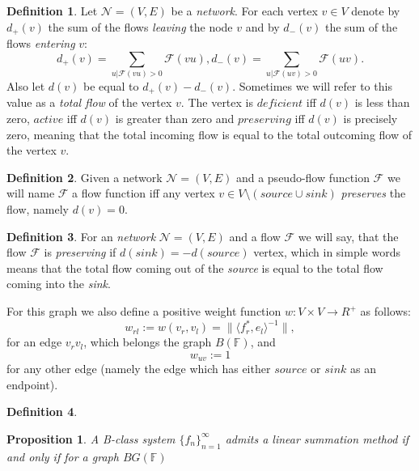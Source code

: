 \documentclass[12pt]{article}
\renewcommand{\cal}[1]{\mathcal{#1}}
\newtheorem{prop}{Proposition}
\theoremstyle{definition}
\newtheorem{definition}{Definition}
\newcommand{\seq}[1]{\{{#1}_n\}_{n=1}^\infty}
\newcommand{\fsys}{\mathbb{F}}
\numberwithin{remark}{section}
\numberwithin{theorem}{section}
\numberwithin{prop}{section}
\numberwithin{equation}{section}
\numberwithin{lemma}{section}
\numberwithin{prop_under_lemma}{lemma}
\begin{document}
    \begin{definition}
        Let $\cal{N} = (V, E)$ be a \textit{network}. For each vertex $v \in V$
        denote by $d_{+}(v)$ the sum of the flows \textit{leaving} the node $v$ and by
        $d_{-}(v)$ the sum of the flows \textit{entering} $v$:
        \begin{equation*}
            d_{+}(v) = \sum_{u | \cal{F}(vu) > 0} \cal{F}(vu),
            d_{-}(v) = \sum_{u | \cal{F}(uv) > 0} \cal{F}(uv).
        \end{equation*}
        Also let $d(v)$ be equal to $d_{+}(v) - d_{-}(v)$. Sometimes we will refer to this value as
        a \textit{total flow} of the vertex $v$.
        The vertex is $deficient$ iff $d(v)$ is less than zero,
        $active$ iff $d(v)$ is greater than zero and
        $preserving$ iff $d(v)$ is precisely zero, meaning that the total incoming flow
        is equal to the total outcoming flow of the vertex $v$.
    \end{definition}
    \begin{definition}
        Given a network $\cal{N} = (V, E)$ and a pseudo-flow function $\cal{F}$ we will name $\cal{F}$ a flow function iff 
        any vertex $v\in V\setminus (\mathit{source}\cup\mathit{sink})$ \textit{preserves} the flow, namely
        $d(v) = 0$.
    \end{definition}
    \begin{definition}
        For an \textit{network} $\mathcal{N} =  (V, E)$ and a flow $\cal{F}$ we will say,
        that the flow $\cal{F}$ is \textit{preserving} if $d(\mathit{sink}) = -d(\mathit{source})$ vertex, which
        in simple words means that the total flow coming out of the \textit{source} is equal to the total flow
        coming into the \textit{sink}.
    \end{definition}
    
    For this graph we also define a positive weight function $w: V\times V \to R^{+}$ as follows:
    $$
        w_{rl} := w(v_r, v_l) = \|\langle f^*_r, e_l \rangle^{-1}\|,
    $$
    for an edge $v_r v_l$, which belongs the graph $B(\fsys)$, and
    $$
        w_{uv} := 1
    $$
    for any other edge (namely the edge which has either $\mathit{source}$ or $\mathit{sink}$ as an endpoint).
    \begin{definition}
        
    \end{definition}
    
    \begin{prop}
        A B-class system $\seq{f}$ admits a linear summation method if and only if for a graph $BG(\fsys)$
    \end{prop}
    
\end{document}
